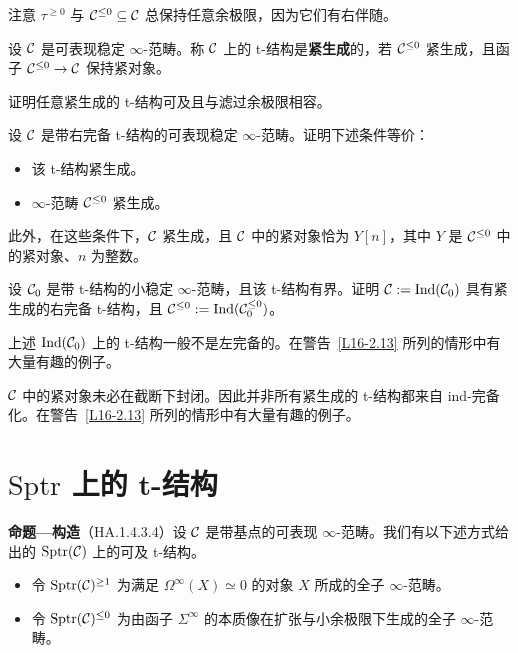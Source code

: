 \begin{remark}\label{L16-4.6}
注意 $\tau^{\ge0}$ 与 $\mathcal{C}^{\le0}\subseteq\mathcal{C}$ 总保持任意余极限，因为它们有右伴随。
\end{remark}

\begin{definition}\label{L16-4.7}
设 $\mathcal{C}$ 是可表现稳定 $\infty$-范畴。称 $\mathcal{C}$ 上的 t-结构是\textbf{紧生成}的，若 $\mathcal{C}^{\le0}$ 紧生成，且函子 $\mathcal{C}^{\le0}\to\mathcal{C}$ 保持紧对象。
\end{definition}

\begin{exercise}\label{L16-4.8}
证明任意紧生成的 t-结构可及且与滤过余极限相容。
\end{exercise}

\begin{exercise}\label{L16-4.9}
设 $\mathcal{C}$ 是带右完备 t-结构的可表现稳定 $\infty$-范畴。证明下述条件等价：
\begin{itemize}[leftmargin=2.2em,itemsep=0.1em]
\item 该 t-结构紧生成。
\item $\infty$-范畴 $\mathcal{C}^{\le0}$ 紧生成。
\end{itemize}
此外，在这些条件下，$\mathcal{C}$ 紧生成，且 $\mathcal{C}$ 中的紧对象恰为 $Y[n]$，其中 $Y$ 是 $\mathcal{C}^{\le0}$ 中的紧对象、$n$ 为整数。
\end{exercise}

\begin{exercise}\label{L16-4.10}
设 $\mathcal{C}_0$ 是带 t-结构的小稳定 $\infty$-范畴，且该 t-结构有界。证明 $\mathcal{C}:=\operatorname{Ind}(\mathcal{C}_0)$ 具有紧生成的右完备 t-结构，且 $\mathcal{C}^{\le0}:=\operatorname{Ind}(\mathcal{C}_0^{\le0})$。
\end{exercise}

\begin{warning}\label{L16-4.11}
上述 $\operatorname{Ind}(\mathcal{C}_0)$ 上的 t-结构一般不是左完备的。在警告~\ref{L16-2.13} 所列的情形中有大量有趣的例子。
\end{warning}

\begin{warning}\label{L16-4.12}
$\mathcal{C}$ 中的紧对象未必在截断下封闭。因此并非所有紧生成的 t-结构都来自 ind-完备化。在警告~\ref{L16-2.13} 所列的情形中有大量有趣的例子。
\end{warning}

\section{$\mathrm{Sptr}$ 上的 t-结构}

\nitem\label{L16-5.1}\textbf{命题—构造}（HA.1.4.3.4）\quad 设 $\mathcal{C}$ 是带基点的可表现 $\infty$-范畴。我们有以下述方式给出的 $\mathrm{Sptr}(\mathcal{C})$ 上的可及 t-结构。
\begin{itemize}[leftmargin=2.2em,itemsep=0.1em]
\item 令 $\mathrm{Sptr}(\mathcal{C})^{\ge1}$ 为满足 $\Omega^{\infty}(X)\simeq0$ 的对象 $X$ 所成的全子 $\infty$-范畴。
\item 令 $\mathrm{Sptr}(\mathcal{C})^{\le0}$ 为由函子 $\Sigma^{\infty}$ 的本质像在扩张与小余极限下生成的全子 $\infty$-范畴。
\end{itemize}

